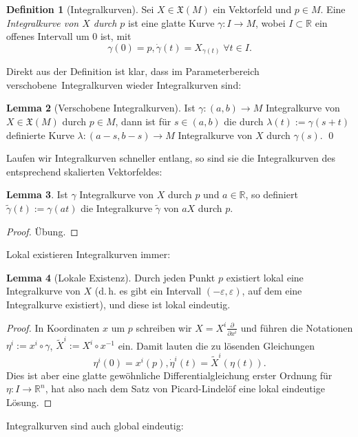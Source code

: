\documentclass[a4paper]{scrreprt}
\numberwithin{equation}{chapter}
\newcommand{\R}{\mathbb{R}}
\theoremstyle{definition}
\newtheorem{defn}{Definition}[section]
\newtheorem{lemma}[defn]{Lemma}
\newcommand{\bewUeb}{\begin{proof}Übung.\end{proof}}
\begin{document}
\begin{defn}[Integralkurven]
	Sei $X \in \mathfrak X(M)$ ein Vektorfeld und $p\in M$. Eine \emph{Integralkurve von $X$ durch $p$} ist eine glatte Kurve $\gamma\colon I \to M$, wobei $I \subset \R$ ein offenes Intervall um 0 ist, mit \[\gamma(0) = p, \dot\gamma(t) = X_{\gamma(t)} \; \forall t \in I.\]
\end{defn}
Direkt aus der Definition ist klar, dass im Parameterbereich \glqq verschobene\grqq\ Integralkurven wieder Integralkurven sind:
\begin{lemma}[Verschobene Integralkurven] \label{lemma:int_kurv_versch}
	Ist $\gamma\colon (a,b) \to M$ Integralkurve von $X\in\mathfrak X(M)$ durch $p\in M$, dann ist für $s \in (a,b)$ die durch $\lambda(t) := \gamma(s + t)$ definierte Kurve $\lambda\colon (a-s,b-s) \to M$ Integralkurve von $X$ durch $\gamma(s)$. \qed
\end{lemma}
Laufen wir Integralkurven schneller entlang, so sind sie die Integralkurven des entsprechend skalierten Vektorfeldes:
\begin{lemma}
	Ist $\gamma$ Integralkurve von $X$ durch $p$ und $a\in\R$, so definiert $\tilde\gamma(t) := \gamma(at)$ die Integralkurve $\tilde\gamma$ von $aX$ durch $p$. \bewUeb
\end{lemma}
Lokal existieren Integralkurven immer:
\begin{lemma}[Lokale Existenz]
	Durch jeden Punkt $p$ existiert lokal eine Integralkurve von $X$ (d.\,h. es gibt ein Intervall $(-\varepsilon,\varepsilon)$, auf dem eine Integralkurve existiert), und diese ist lokal eindeutig.

	\begin{proof}
		In Koordinaten $x$ um $p$ schreiben wir $X = X^i \frac{\partial}{\partial x^i}$ und führen die Notationen $\eta^i := x^i \circ \gamma$, $\tilde X^i := X^i \circ x^{-1}$ ein. Damit lauten die zu lösenden Gleichungen
		\[\eta^i(0) = x^i(p), \dot \eta^i(t) = \tilde X^i(\eta(t)).\]
		Dies ist aber eine glatte gewöhnliche Differentialgleichung erster Ordnung für $\eta\colon I \to \R^n$, hat also nach dem Satz von Picard-Lindelöf eine lokal eindeutige Lösung.
	\end{proof}
\end{lemma}
Integralkurven sind auch global eindeutig:
\end{document}
